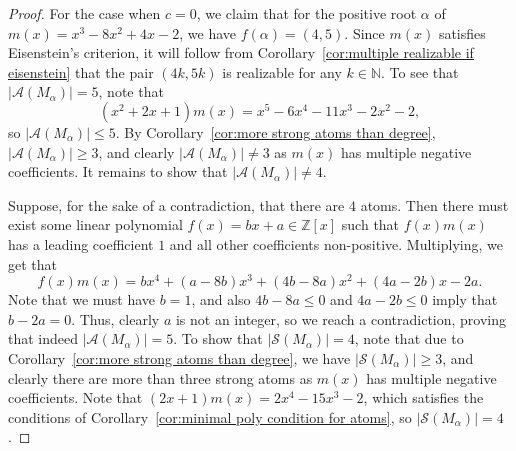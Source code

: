\documentclass[10pt,a4paper]{amsart}
\newcommand{\nn}{\mathbb{N}}
\newcommand{\zz}{\mathbb{Z}}
\begin{document}
\begin{proof}
    For the case when $c=0$, we claim that for the positive root $\alpha$ of $m(x) = x^3 - 8x^2 + 4x - 2$, we have $f(\alpha) = (4,5)$. Since $m(x)$ satisfies Eisenstein's criterion, it will follow from Corollary~\ref{cor:multiple realizable if eisenstein} that the pair $(4k,5k)$ is realizable for any $k \in \nn$. To see that $|\mathcal{A}(M_\alpha)| = 5$, note that
    \[
    	(x^2+2x+1)m(x) = x^5 - 6x^4 - 11x^3 - 2x^2 - 2,
    \]
    so $|\mathcal{A}(M_\alpha)|\le 5$. By Corollary~\ref{cor:more strong atoms than degree}, $|\mathcal{A}(M_\alpha)| \ge 3$, and clearly $|\mathcal{A}(M_\alpha)|\ne 3$ as $m(x)$ has multiple negative coefficients. It remains to show that $|\mathcal{A}(M_\alpha)| \ne 4$.
    
    Suppose, for the sake of a contradiction, that there are $4$ atoms. Then there must exist some linear polynomial $f(x) = bx+a \in \zz[x]$ such that $f(x)m(x)$ has a leading coefficient $1$ and all other coefficients non-positive. Multiplying, we get that
    \[
        f(x)m(x) = bx^4 + (a-8b)x^3 + (4b-8a)x^2 + (4a-2b)x - 2a.
    \]
    Note that we must have $b=1$, and also $4b-8a\le 0$ and $4a-2b\le 0$ imply that $b-2a=0$. Thus, clearly $a$ is not an integer, so we reach a contradiction, proving that indeed $|\mathcal{A}(M_\alpha)| = 5$. To show that $|\mathcal{S}(M_\alpha)| = 4$, note that due to Corollary~\ref{cor:more strong atoms than degree}, we have $|\mathcal{S}(M_\alpha)|\ge 3$, and clearly there are more than three strong atoms as $m(x)$ has multiple negative coefficients. Note that $(2x+1)m(x) = 2x^4-15x^3-2$, which satisfies the conditions of Corollary~\ref{cor:minimal poly condition for atoms}, so $|\mathcal{S}(M_\alpha)| = 4$.
    \smallskip
    

\end{proof}
\end{document}
